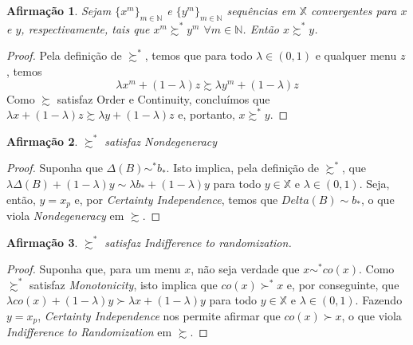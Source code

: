 \documentclass[11pt, a4paper]{article}
\theoremstyle{nonumberplain}
\newtheorem{proof}{Dem.}
\theoremstyle{plain}
\newtheorem{claim}{Afirmação}
\theoremstyle{plain}
\begin{document}
\begin{claim} Sejam $\{x^m\}_{m\in\mathbb{N}}$ e $\{y^m\}_{m\in\mathbb{N}}$ sequências em $\mathbb{X}$ convergentes para $x$ e $y$, respectivamente, tais que $x^m\succsim^* y^m$ $\forall m\in \mathbb{N}$. Então $x\succsim^* y$.\end{claim}
\begin{proof}
Pela definição de $\succsim^*$, temos que para todo $\lambda\in (0,1)$ e qualquer menu $z$, temos $$\lambda x^m + (1-\lambda)z \succsim \lambda y^m + (1-\lambda)z$$ Como $\succsim$ satisfaz Order e Continuity, concluímos que $\lambda x + (1-\lambda)z \succsim \lambda y + (1-\lambda)z$ e, portanto, $x\succsim^* y$.
\end{proof}

\begin{claim}$\succsim^*$ satisfaz \emph{Nondegeneracy}\end{claim}
\begin{proof}
Suponha que $\Delta(B)\sim^* b_*$. Isto implica, pela definição de $\succsim^*$, que $\lambda \Delta(B)+(1-\lambda)y \sim \lambda b_*+(1-\lambda)y$ para todo $y \in \mathbb{X}$ e $\lambda \in (0,1)$. Seja, então, $y=x_p$ e, por \emph{Certainty Independence}, temos que $Delta(B)\sim b_*$, o que viola \emph{Nondegeneracy} em $\succsim$.
\end{proof}

\begin{claim}$\succsim^*$ satisfaz \emph{Indifference to randomization}.\end{claim}
\begin{proof}
Suponha que, para um menu $x$, não seja verdade que $x\sim^* co(x)$. Como $\succsim^*$ satisfaz \emph{Monotonicity}, isto implica que $co(x)\succ^* x$ e, por conseguinte, que $\lambda co(x)+(1-\lambda)y \succ \lambda x+(1-\lambda)y$ para todo $y \in \mathbb{X}$ e $\lambda \in (0,1)$. Fazendo $y=x_p$, \emph{Certainty Independence} nos permite afirmar que $co(x)\succ x$, o que viola \emph{Indifference to Randomization} em $\succsim$.  
\end{proof}

\end{document}
